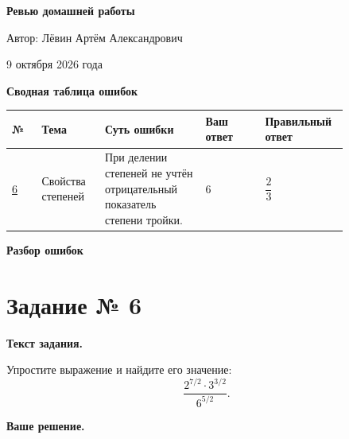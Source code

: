\documentclass[12pt,a4paper]{article}
\begin{document}
\begin{titlepage}
\centering
\vspace*{0.29\textheight}
{\LARGE\bfseries Ревью домашней работы\par}
\vspace{2.3cm}
{\large Автор: Лёвин Артём Александрович\par}
\vspace{0.8cm}
{\large 9 октября 2026 года\par}
\vfill
{}
\vspace*{1.1cm}
\end{titlepage}

\newpage
\begin{center}
{\Large\bfseries Сводная таблица ошибок}
\end{center}
\vspace{1cm}
\small
\begin{tabular}{@{}p{0.08\linewidth}p{0.17\linewidth}p{0.27\linewidth}p{0.16\linewidth}p{0.16\linewidth}@{}}
\toprule
\textbf{№} & \textbf{Тема} & \textbf{Суть ошибки} &
\textbf{Ваш ответ} & \textbf{Правильный ответ}\\
\midrule
\hyperref[task:6]{6} &
Свойства степеней &
При делении степеней не учтён отрицательный показатель степени тройки. &
\(6\) & \(\dfrac{2}{3}\)\\
\bottomrule
\end{tabular}
\normalsize

\newpage
\thispagestyle{empty}
\null\vfill
\begin{center}
{\Huge\bfseries Разбор ошибок}
\end{center}
\vfill\null

\newpage
{}\label{task:6}
\section*{Задание № 6}

\textbf{Текст задания.}

Упростите выражение и найдите его значение:
\[
\frac{2^{7/2}\cdot 3^{3/2}}{6^{5/2}}.
\]

\textbf{Ваше решение.}
\end{document}
